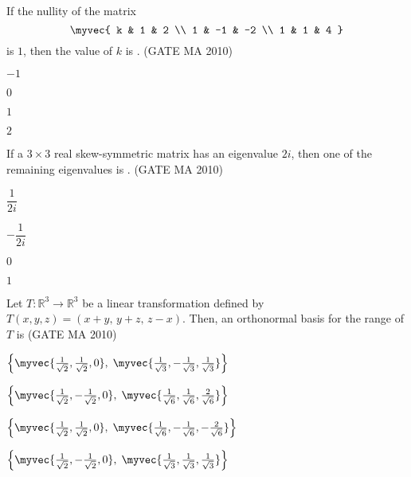 \item If the nullity of the matrix 
\[
\myvec{ k & 1 & 2 \\ 1 & -1 & -2 \\ 1 & 1 & 4 }
\]
is $1$, then the value of $k$ is \underline{\hspace{2cm}}.
\hfill(GATE MA 2010)
\begin{enumerate}
\begin{multicols}{4}
\item $-1$
\item $0$
\item $1$
\item $2$
\end{multicols}
\end{enumerate}
\item If a $3\times 3$ real skew-symmetric matrix has an eigenvalue $2i$, then one of the remaining eigenvalues is \underline{\hspace{2cm}}.
\hfill(GATE MA 2010)
\begin{enumerate}
\begin{multicols}{4}
\item $\dfrac{1}{2i}$
\item $-\dfrac{1}{2i}$
\item $0$
\item $1$
\end{multicols}
\end{enumerate}
\item Let $T:\mathbb{R}^3\to\mathbb{R}^3$ be a linear transformation defined by $T(x,y,z)=(x+y,\,y+z,\,z-x)$. Then, an orthonormal basis for the range of $T$ is \underline{\hspace{2cm}}
\hfill(GATE MA 2010)
\begin{enumerate}
\begin{multicols}{2}
    \item $\left\{\myvec{\tfrac{1}{\sqrt{2}},\tfrac{1}{\sqrt{2}},0},\;\myvec{\tfrac{1}{\sqrt{3}},-\tfrac{1}{\sqrt{3}},\tfrac{1}{\sqrt{3}}}\right\}$

\item $\left\{\myvec{\tfrac{1}{\sqrt{2}},-\tfrac{1}{\sqrt{2}},0},\;\myvec{\tfrac{1}{\sqrt{6}},\tfrac{1}{\sqrt{6}},\tfrac{2}{\sqrt{6}}}\right\}$

\item $\left\{\myvec{\tfrac{1}{\sqrt{2}},\tfrac{1}{\sqrt{2}},0},\;\myvec{\tfrac{1}{\sqrt{6}},-\tfrac{1}{\sqrt{6}},-\tfrac{2}{\sqrt{6}}}\right\}$

\item $\left\{\myvec{\tfrac{1}{\sqrt{2}},-\tfrac{1}{\sqrt{2}},0},\;\myvec{\tfrac{1}{\sqrt{3}},\tfrac{1}{\sqrt{3}},\tfrac{1}{\sqrt{3}}}\right\}$
\end{multicols}
\end{enumerate}
